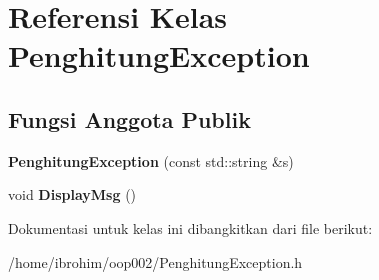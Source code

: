 \hypertarget{classPenghitungException}{}\section{Referensi Kelas Penghitung\+Exception}
\label{classPenghitungException}
\subsection*{Fungsi Anggota Publik}
\begin{DoxyCompactItemize}
\item 
\hypertarget{classPenghitungException_a988a376427f299e37cc8812497a0f0d4}{}{\bfseries Penghitung\+Exception} (const std\+::string \&s)\label{classPenghitungException_a988a376427f299e37cc8812497a0f0d4}

\item 
\hypertarget{classPenghitungException_aac32ab678c77a1b69229d89e6ed77405}{}void {\bfseries Display\+Msg} ()\label{classPenghitungException_aac32ab678c77a1b69229d89e6ed77405}

\end{DoxyCompactItemize}


Dokumentasi untuk kelas ini dibangkitkan dari file berikut\+:\begin{DoxyCompactItemize}
\item 
/home/ibrohim/oop002/Penghitung\+Exception.\+h\end{DoxyCompactItemize}
